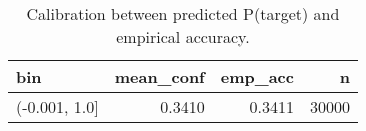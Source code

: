 \begin{table}[!ht]
\centering
\begin{table}
\caption{Calibration between predicted P(target) and empirical accuracy.}
\label{tab:fig05}
\begin{tabular}{lrrr}
\toprule
bin & mean\_conf & emp\_acc & n \\
\midrule
(-0.001, 1.0] & 0.3410 & 0.3411 & 30000 \\
\bottomrule
\end{tabular}
\end{table}
\end{table}
